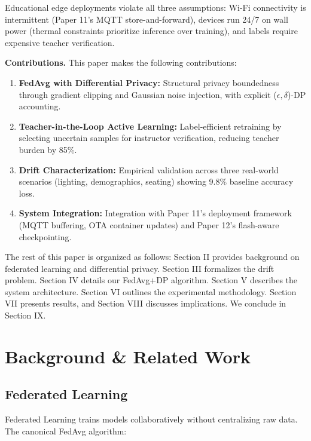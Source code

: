 \documentclass[conference]{IEEEtran}
\begin{document}
Educational edge deployments violate all three assumptions: Wi-Fi connectivity is intermittent (Paper 11's MQTT store-and-forward), devices run 24/7 on wall power (thermal constraints prioritize inference over training), and labels require expensive teacher verification.

\textbf{Contributions.} This paper makes the following contributions:

\begin{enumerate}
    \item \textbf{FedAvg with Differential Privacy:} Structural privacy boundedness through gradient clipping and Gaussian noise injection, with explicit ($\epsilon, \delta$)-DP accounting.
    \item \textbf{Teacher-in-the-Loop Active Learning:} Label-efficient retraining by selecting uncertain samples for instructor verification, reducing teacher burden by 85\%.
    \item \textbf{Drift Characterization:} Empirical validation across three real-world scenarios (lighting, demographics, seating) showing 9.8\% baseline accuracy loss.
    \item \textbf{System Integration:} Integration with Paper 11's deployment framework (MQTT buffering, OTA container updates) and Paper 12's flash-aware checkpointing.
\end{enumerate}

The rest of this paper is organized as follows: Section II provides background on federated learning and differential privacy. Section III formalizes the drift problem. Section IV details our FedAvg+DP algorithm. Section V describes the system architecture. Section VI outlines the experimental methodology. Section VII presents results, and Section VIII discusses implications. We conclude in Section IX.

\section{Background \& Related Work}

\subsection{Federated Learning}

Federated Learning \cite{mcmahan2017} trains models collaboratively without centralizing raw data. The canonical FedAvg algorithm:
\end{document}
